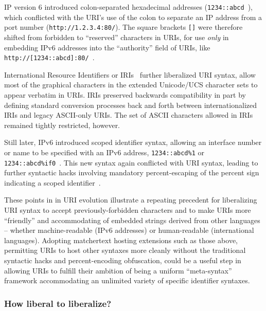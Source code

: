 IP version 6 introduced colon-separated hexadecimal addresses
(\eg \verb|1234::abcd|~\cite{rfc2373}),
which conflicted with the URI's use of the colon to separate
an IP address from a port number (\eg \verb|http://1.2.3.4:80/|).
The square brackets \verb|[]| were therefore shifted
from forbidden to ``reserved'' characters in URIs,
for use \emph{only} in embedding IPv6 addresses
into the ``authority'' field of URIs,
like \verb|http://[1234::abcd]:80/|~\cite{rfc2732}.

International Resource Identifiers or IRIs~\cite{rfc3987}
further liberalized URI syntax,
allow most of the graphical characters
in the extended Unicode/UCS character sets to appear verbatim in URIs.
IRIs preserved backwards compatibility
in part by defining standard conversion processes back and forth
between internationalized IRIs and legacy ASCII-only URIs.
The set of ASCII characters allowed in IRIs remained tightly restricted,
however.

Still later, IPv6 introduced scoped identifier syntax,
allowing an interface number or name to be specified with an IPv6 address,
\eg \verb|1234::abcd%1| or \verb|1234::abcd%if0|~\cite{rfc4007}.
This new syntax again conflicted with URI syntax,
leading to further syntactic hacks involving
mandatory percent-escaping of the percent sign
indicating a scoped identifier~\cite{rfc6874}.

These points in in URI evolution illustrate
a repeating precedent for liberalizing URI syntax
to accept previously-forbidden characters
and to make URIs more ``friendly'' and accommodating
of embedded strings derived from other languages --
whether machine-readable (\eg IPv6 addresses)
or human-readable (international languages).
Adopting matchertext hosting extensions such as those above,
permitting URIs to host other syntaxes more cleanly
without the traditional  syntactic hacks and percent-encoding obfuscation,
could be a useful step in allowing URIs to fulfill their ambition
of being a uniform ``meta-syntax'' framework
accommodating an unlimited variety of specific identifier syntaxes.



\subsubsection{How liberal to liberalize?}
\label{sec:host:uri:liberal}

